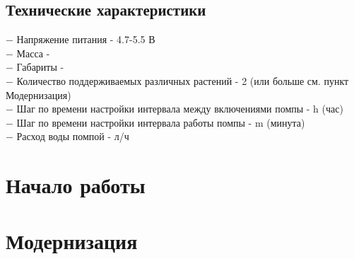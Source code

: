 \documentclass[12pt]{article}
\begin{document}
	\subsection{Технические характеристики}
	
	$-$ Напряжение питания - 4.7-5.5 В \\
	
	$-$ Масса - \\
	
	$-$ Габариты - \\
	
	$-$ Количество поддерживаемых различных растений - 2 (или больше см. пункт Модернизация) \\
	
	$-$ Шаг по времени настройки интервала между включениями помпы - h (час) \\
	
	$-$ Шаг по времени настройки интервала работы помпы - m (минута)\\
	
	$-$ Расход воды помпой -  л/ч \\
	
	
	
	
	\section{Начало работы}
	
	
	\section{Модернизация}
	
	
	
	
	
\end{document}
